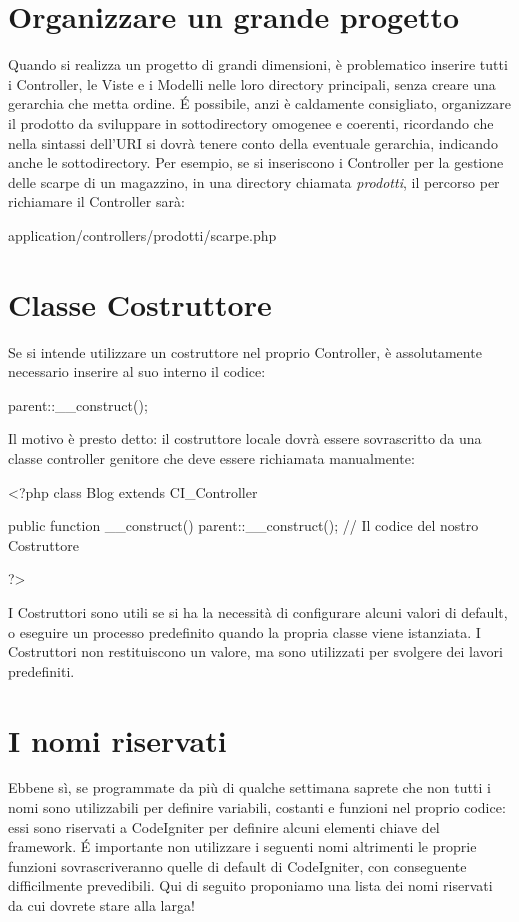 \section*{Organizzare un grande progetto}
Quando si realizza un progetto di grandi dimensioni, è problematico inserire tutti i Controller, le Viste e i Modelli nelle loro directory principali, senza creare una gerarchia che metta ordine.
\'E possibile, anzi è caldamente consigliato, organizzare il prodotto da sviluppare in sottodirectory omogenee e coerenti, ricordando che nella sintassi dell'\ac{URI} si dovrà tenere conto della eventuale gerarchia, indicando anche le sottodirectory. Per esempio, se si inseriscono i Controller per la gestione delle scarpe di un magazzino, in una directory chiamata \emph{prodotti}, il percorso per richiamare il Controller  sarà:

\begin{code}
application/controllers/prodotti/scarpe.php
\end{code}

\section*{Classe Costruttore}
Se si intende utilizzare un costruttore nel proprio Controller, è assolutamente necessario inserire al suo interno il codice:

\begin{code}
parent::__construct();
\end{code}

Il motivo è presto detto: il costruttore locale dovrà essere sovrascritto da una classe controller genitore che deve essere richiamata manualmente:

\begin{code}
<?php
class Blog extends CI_Controller {

       public function __construct()
       {
            parent::__construct();
            // Il codice del nostro Costruttore
       }
}
?>
\end{code}

I Costruttori sono utili se si ha la necessità di configurare alcuni valori di default, o eseguire un processo predefinito quando la propria classe viene istanziata. I Costruttori non restituiscono un valore, ma sono utilizzati per svolgere dei lavori predefiniti.

\section{I nomi riservati}
Ebbene sì, se programmate da più di qualche settimana saprete che non tutti i nomi sono utilizzabili per definire variabili, costanti e funzioni nel proprio codice: essi sono riservati a CodeIgniter per definire alcuni elementi chiave del framework. \'E importante non utilizzare i seguenti nomi altrimenti le proprie funzioni sovrascriveranno quelle di default di CodeIgniter, con conseguente difficilmente prevedibili. Qui di seguito proponiamo una lista dei nomi riservati da cui dovrete stare alla larga!

